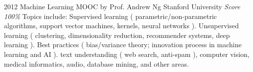 \documentclass[11pt,a4paper]{moderncv}
\begin{document}
\cventry
    {2012}
    {Machine Learning}
    {MOOC by Prof. Andrew Ng}
    {Stanford University}
    {\textit{Score 100\%}}
    {
        Topics include:                                                          %
            Supervised learning (                                                %
                    parametric/non-parametric algorithms,                        %
                    support vector machines,                                     %
                    kernels,                                                     %
                    neural networks                                              %
                ).                                                               %
            Unsupervised learning (                                              %
                    clustering,                                                  %
                    dimensionality reduction,                                    %
                    recommender systems,                                         %
                    deep learning                                                %
                ).                                                               %
            Best practices (                                                     %
                    bias/variance theory;                                        %
                    innovation process in machine learning and AI                %
                ).                                                               %
                text understanding (                                             %
                    web search,                                                  %
                    anti-spam                                                    %
                ),                                                               %
                computer vision,                                                 %
                medical informatics,                                             %
                audio,                                                           %
                database mining,                                                 %
                and other areas.                                                 %
    }
\end{document}

